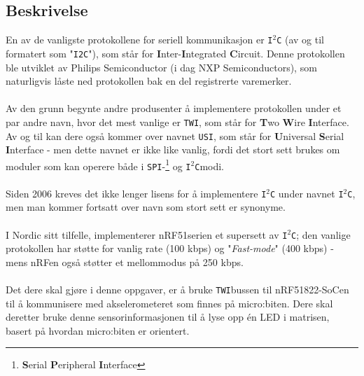 \documentclass[11pt,a4paper]{article}
\begin{document}
\subsection{Beskrivelse}
En av de vanligste protokollene for seriell kommunikasjon er \texttt{I}$^2$\texttt{C} (av og til formatert som "\texttt{I2C}"), som står for \textbf{I}nter-\textbf{I}ntegrated \textbf{C}ircuit. Denne protokollen ble utviklet av Philips Semiconductor (i dag NXP Semiconductors), som naturligvis låste ned protokollen bak en del registrerte varemerker.\\
\\
Av den grunn begynte andre produsenter å implementere protokollen under et par andre navn, hvor det mest vanlige er \texttt{TWI}, som står for \textbf{T}wo \textbf{W}ire \textbf{I}nterface. Av og til kan dere også kommer over navnet \texttt{USI}, som står for \textbf{U}niversal \textbf{S}erial \textbf{I}nterface - men dette navnet er ikke like vanlig, fordi det stort sett brukes om moduler som kan operere både i \texttt{SPI}-\footnote{\textbf{S}erial \textbf{P}eripheral \textbf{I}nterface} og \texttt{I}$^2$\texttt{C}modi.\\
\\
Siden 2006 kreves det ikke lenger lisens for å implementere \texttt{I}$^2$\texttt{C} under navnet \texttt{I}$^2$\texttt{C}, men man kommer fortsatt over navn som stort sett er synonyme.\\
\\
I Nordic sitt tilfelle, implementerer nRF51serien et supersett av \texttt{I}$^2$\texttt{C}; den vanlige protokollen har støtte for vanlig rate (100 kbps) og "\textit{Fast-mode}" (400 kbps) - mens nRFen også støtter et mellommodus på 250 kbps.\\
\\
Det dere skal gjøre i denne oppgaver, er å bruke \texttt{TWI}bussen til nRF51822-SoCen til å kommunisere med akselerometeret som finnes på micro:biten. Dere skal deretter bruke denne sensorinformasjonen til å lyse opp én LED i matrisen, basert på hvordan micro:biten er orientert.
\end{document}
